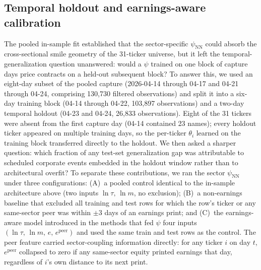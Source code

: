 \subsection{Temporal holdout and earnings-aware calibration}\label{sec:earnings_holdout}

The pooled in-sample fit established that the sector-specific $\psi_{\text{NN}}$ could absorb the cross-sectional smile geometry of the 31-ticker universe, but it left the temporal-generalization question unanswered: would a $\psi$ trained on one block of capture days price contracts on a held-out subsequent block? To answer this, we used an eight-day subset of the pooled capture (2026-04-14 through 04-17 and 04-21 through 04-24, comprising 130{,}730 filtered observations) and split it into a six-day training block (04-14 through 04-22, 103{,}897 observations) and a two-day temporal holdout (04-23 and 04-24, 26{,}833 observations). Eight of the 31 tickers were absent from the first capture day (04-14 contained 23 names); every holdout ticker appeared on multiple training days, so the per-ticker $\theta_i$ learned on the training block transferred directly to the holdout. We then asked a sharper question: which fraction of any test-set generalization gap was attributable to scheduled corporate events embedded in the holdout window rather than to architectural overfit? To separate these contributions, we ran the sector $\psi_{\text{NN}}$ under three configurations: (A)~a pooled control identical to the in-sample architecture above (two inputs $\ln\tau,\,\ln m$, no exclusion); (B)~a non-earnings baseline that excluded all training and test rows for which the row's ticker or any same-sector peer was within $\pm 3$ days of an earnings print; and (C)~the earnings-aware model introduced in the methods that fed $\psi$ four inputs $(\ln\tau,\,\ln m,\,e,\,e^{\text{peer}})$ and used the same train and test rows as the control. The peer feature carried sector-coupling information directly: for any ticker $i$ on day $t$, $e^{\text{peer}}$ collapsed to zero if any same-sector equity printed earnings that day, regardless of $i$'s own distance to its next print.

